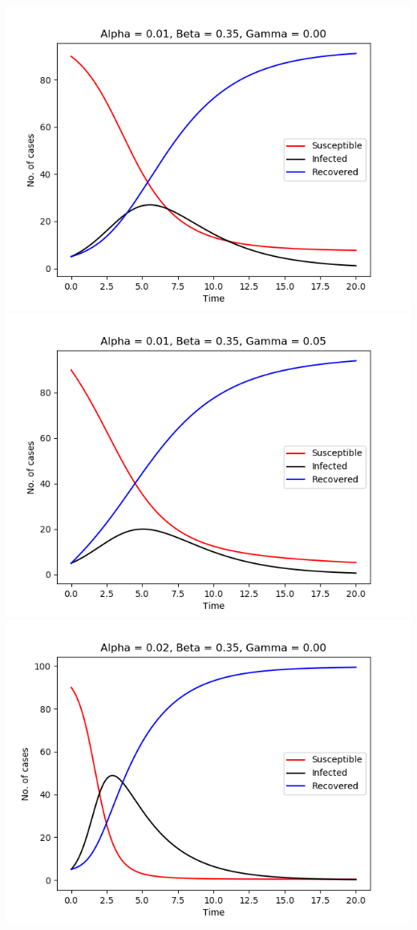 \includegraphics[scale=0.4]{fig/img/t_a1_b35_g0.png}
\includegraphics[scale=0.4]{fig/img/t_a1_b35_g5.png}\\
\includegraphics[scale=0.4]{fig/img/t_a2_b35_g0.png}
